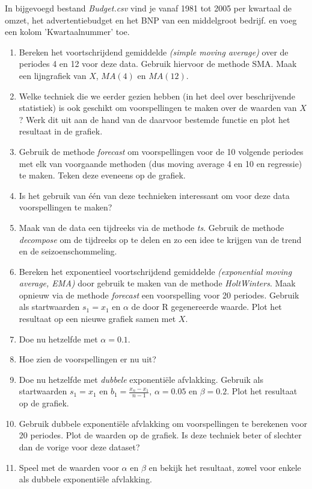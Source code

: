 \begin{exercise}
In bijgevoegd bestand \emph{Budget.csv} vind je vanaf 1981 tot 2005 per kwartaal de omzet, het advertentiebudget en het BNP van een middelgroot bedrijf.  en voeg een kolom 'Kwartaalnummer' toe.
\begin{enumerate}
	\item Bereken het voortschrijdend gemiddelde \emph{(simple moving average)} over de periodes 4 en 12 voor deze data. Gebruik hiervoor de methode SMA. Maak een lijngrafiek van $X$, $MA(4)$ en $MA(12)$.
	\item Welke techniek die we eerder gezien hebben (in het deel over beschrijvende statistiek) is ook geschikt om voorspellingen te maken over de waarden van $X$? Werk dit uit aan de hand van de daarvoor bestemde functie en plot het resultaat in de grafiek.
	\item Gebruik de methode \emph{forecast} om voorspellingen voor de 10 volgende periodes met elk van voorgaande methoden (dus moving average 4 en 10 en regressie) te maken. Teken deze eveneens op de grafiek.
\item Is het gebruik van één van deze technieken interessant om voor deze data voorspellingen te maken? 
\item Maak van de data een tijdreeks via de methode \emph{ts}. Gebruik de methode \emph{decompose} om de tijdreeks op te delen en zo een idee te krijgen van de trend en de seizoenschommeling.
 \item Bereken het exponentieel voortschrijdend gemiddelde \emph{(exponential moving average, EMA)} door gebruik te maken van de methode \emph{HoltWinters}. Maak opnieuw via de methode \emph{forecast} een voorspelling voor 20 periodes. Gebruik als startwaarden $s_1 = x_1$ en $\alpha $ de door R gegenereerde waarde. Plot het resultaat op een nieuwe grafiek samen met $X$.
\item Doe nu hetzelfde met $\alpha=0.1$. 
\item Hoe zien de voorspellingen er nu uit?
\item Doe nu hetzelfde met \emph{dubbele} exponentiële afvlakking. Gebruik als startwaarden $s_1 = x_1$ en $b_1 = \frac{x_n - x_1}{n - 1}$, $\alpha =  0.05$ en $\beta = 0.2$. Plot het resultaat op de grafiek.
\item Gebruik dubbele exponentiële afvlakking om voorspellingen te berekenen voor 20 periodes. Plot de waarden op de grafiek. Is deze techniek beter of slechter dan de vorige voor deze dataset?
\item Speel met de waarden voor $\alpha$ en $\beta$ en bekijk het resultaat, zowel voor enkele als dubbele exponentiële afvlakking.

\end{enumerate}
\end{exercise}
